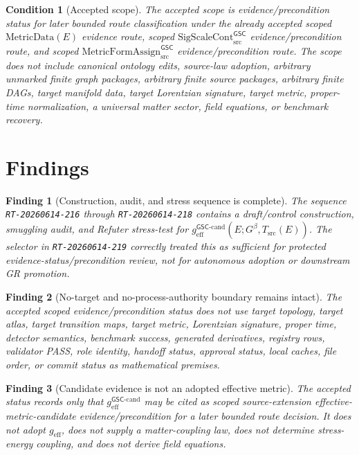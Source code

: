 \documentclass[11pt]{article}
\newcommand{\Gbeta}{G^\beta}
\newcommand{\SigScaleCont}{\mathrm{SigScaleCont}^{\mathsf{GSC}}_{\mathrm{src}}}
\newcommand{\MetricFormAssign}{\mathrm{MetricFormAssign}^{\mathsf{GSC}}_{\mathrm{src}}}
\newcommand{\geff}{g_{\mathrm{eff}}}
\newcommand{\geffCand}{g_{\mathrm{eff}}^{\mathsf{GSC}\mbox{-}\mathrm{cand}}}
\newtheorem{finding}{Finding}
\newtheorem{condition}{Condition}
\begin{document}
\begin{condition}[Accepted scope]
The accepted scope is evidence/precondition status for later bounded route
classification under the already accepted scoped \(\mathrm{MetricData}(E)\)
evidence route, scoped \(\SigScaleCont\) evidence/precondition route, and
scoped \(\MetricFormAssign\) evidence/precondition route. The scope does not
include canonical ontology edits, source-law adoption, arbitrary unmarked
finite graph packages, arbitrary finite source packages, arbitrary finite
DAGs, target manifold data, target Lorentzian signature, target metric,
proper-time normalization, a universal matter sector, field equations, or
benchmark recovery.
\end{condition}

\section{Findings}

\begin{finding}[Construction, audit, and stress sequence is complete]
The sequence \texttt{RT-20260614-216} through \texttt{RT-20260614-218}
contains a draft/control construction, smuggling audit, and Refuter
stress-test for \(\geffCand(E;\Gbeta,T_{\mathrm{src}}(E))\). The selector in
\texttt{RT-20260614-219} correctly treated this as sufficient for protected
evidence-status/precondition review, not for autonomous adoption or downstream
GR promotion.
\end{finding}

\begin{finding}[No-target and no-process-authority boundary remains intact]
The accepted scoped evidence/precondition status does not use target topology,
target atlas, target transition maps, target metric, Lorentzian signature,
proper time, detector semantics, benchmark success, generated derivatives,
registry rows, validator PASS, role identity, handoff status, approval status,
local caches, file order, or commit status as mathematical premises.
\end{finding}

\begin{finding}[Candidate evidence is not an adopted effective metric]
The accepted status records only that \(\geffCand\) may be cited as scoped
source-extension effective-metric-candidate evidence/precondition for a later
bounded route decision. It does not adopt \(\geff\), does not supply a
matter-coupling law, does not determine stress-energy coupling, and does not
derive field equations.
\end{finding}
\end{document}
